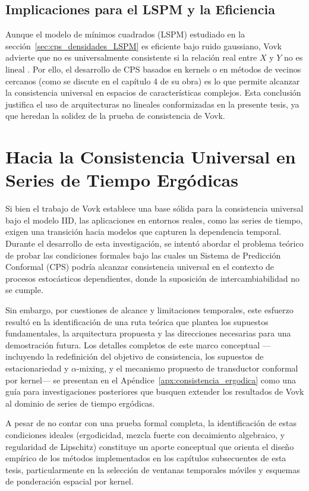 \subsection{Implicaciones para el LSPM y la Eficiencia}

Aunque el modelo de mínimos cuadrados (LSPM) estudiado en la sección~\ref{sec:cps_densidades_LSPM} es eficiente bajo ruido gaussiano, Vovk advierte que no es universalmente consistente si la relación real entre $X$ y $Y$ no es lineal \parencite{Vovk2019}. Por ello, el desarrollo de CPS basados en kernels o en métodos de vecinos cercanos (como se discute en el capítulo 4 de su obra) es lo que permite alcanzar la consistencia universal en espacios de características complejos. Esta conclusión justifica el uso de arquitecturas no lineales conformizadas en la presente tesis, ya que heredan la solidez de la prueba de consistencia de Vovk.

\section{Hacia la Consistencia Universal en Series de Tiempo Ergódicas}
\label{sec:extension_ergodica}

Si bien el trabajo de Vovk \parencite{Vovk2019} establece una base sólida para la consistencia universal bajo el modelo IID, las aplicaciones en entornos reales, como las series de tiempo, exigen una transición hacia modelos que capturen la dependencia temporal. Durante el desarrollo de esta investigación, se intentó abordar el problema teórico de probar las condiciones formales bajo las cuales un Sistema de Predicción Conformal (CPS) podría alcanzar consistencia universal en el contexto de procesos estocásticos dependientes, donde la suposición de intercambiabilidad no se cumple.

Sin embargo, por cuestiones de alcance y limitaciones temporales, este esfuerzo resultó en la identificación de una ruta teórica que plantea los supuestos fundamentales, la arquitectura propuesta y las direcciones necesarias para una demostración futura. Los detalles completos de este marco conceptual —incluyendo la redefinición del objetivo de consistencia, los supuestos de estacionariedad y $\alpha$-mixing, y el mecanismo propuesto de transductor conformal por kernel— se presentan en el Apéndice~\ref{apx:consistencia_ergodica} como una guía para investigaciones posteriores que busquen extender los resultados de Vovk al dominio de series de tiempo ergódicas.

A pesar de no contar con una prueba formal completa, la identificación de estas condiciones ideales (ergodicidad, mezcla fuerte con decaimiento algebraico, y regularidad de Lipschitz) constituye un aporte conceptual que orienta el diseño empírico de los métodos implementados en los capítulos subsecuentes de esta tesis, particularmente en la selección de ventanas temporales móviles y esquemas de ponderación espacial por kernel.